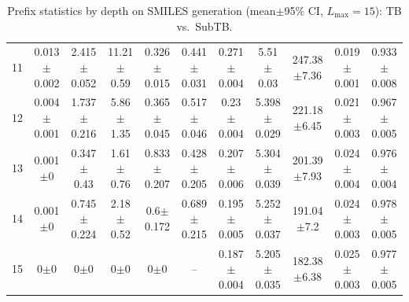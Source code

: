 \documentclass{article}
\theoremstyle{plain}
\theoremstyle{definition}
\theoremstyle{remark}
\begin{document}
\begin{table}[!htbp]
{\begin{tabular}{ccccccccccc}
11 & 0.013$\pm$0.002 & 2.415$\pm$0.052 & 11.21$\pm$0.59 & 0.326$\pm$0.015 & 0.441$\pm$0.031
   & 0.271$\pm$0.004 & 5.51$\pm$0.03 & 247.38$\pm$7.36 & 0.019$\pm$0.001 & 0.933$\pm$0.008 \\
12 & 0.004$\pm$0.001 & 1.737$\pm$0.216 & 5.86$\pm$1.35 & 0.365$\pm$0.045 & 0.517$\pm$0.046
   & 0.23$\pm$0.004 & 5.398$\pm$0.029 & 221.18$\pm$6.45 & 0.021$\pm$0.003 & 0.967$\pm$0.005 \\
13 & 0.001$\pm$0 & 0.347$\pm$0.43 & 1.61$\pm$0.76 & 0.833$\pm$0.207 & 0.428$\pm$0.205
   & 0.207$\pm$0.006 & 5.304$\pm$0.039 & 201.39$\pm$7.93 & 0.024$\pm$0.004 & 0.976$\pm$0.004 \\
14 & 0.001$\pm$0 & 0.745$\pm$0.224 & 2.18$\pm$0.52 & 0.6$\pm$0.172 & 0.689$\pm$0.215
   & 0.195$\pm$0.005 & 5.252$\pm$0.037 & 191.04$\pm$7.2 & 0.024$\pm$0.003 & 0.978$\pm$0.005 \\
15 & 0$\pm$0 & 0$\pm$0 & 0$\pm$0 & 0$\pm$0 & --
   & 0.187$\pm$0.004 & 5.205$\pm$0.035 & 182.38$\pm$6.38 & 0.025$\pm$0.003 & 0.977$\pm$0.005 \\
\bottomrule
\end{tabular}
}%
\caption{Prefix statistics by depth on SMILES generation (mean$\pm$95\% CI, $L_{\max}=15$): TB vs.\ SubTB.}
\label{tab:smiles_L15_prefix_base}
\end{table}
\end{document}
